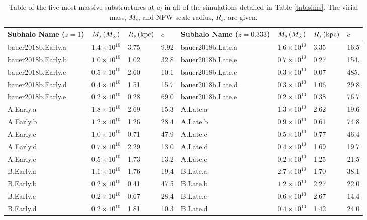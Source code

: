 \begin{table}
\caption{Table of the five most massive substructures at $a_l$ in all of the simulations detailed in Table \ref{tab:sims}. The virial mass, $M_s$, and NFW scale radius, $R_s$, are given.}\label{tab:substructure}
	\begin{tabular}{|l l l l | l l l l|}
	\hline
	Subhalo Name ($z=1$) & $M_s \,(M_\odot)$ & $R_s \, (\text{kpc})$ & $c$ & Subhalo Name ($z=0.333$) & $M_s \,(M_\odot)$ & $R_s \, (\text{kpc})$ & $c$\\	
	\hline
    bauer2018b.Early.a & $1.4 \times 10^{10}$ & 3.75 & 9.92 & bauer2018b.Late.a & $1.6 \times 10^{10}$ & 3.35 & 16.5 \\
    bauer2018b.Early.b & $1.0 \times 10^{10}$ & 1.02 & 32.8 & bauer2018b.Late.e & $0.7 \times 10^{10}$ & 0.27 & 154. \\
    bauer2018b.Early.c & $0.5 \times 10^{10}$ & 2.60 & 10.1 & bauer2018b.Late.c & $0.3 \times 10^{10}$ & 0.07 & 485. \\
    bauer2018b.Early.d & $0.4 \times 10^{10}$ & 1.51 & 15.7 & bauer2018b.Late.d & $0.3 \times 10^{10}$ & 1.06 & 29.8 \\
    bauer2018b.Early.e & $0.2 \times 10^{10}$ & 0.28 & 69.0 & bauer2018b.Late.e & $0.2 \times 10^{10}$ & 0.38 &  76.7\\
	\hline
	A.Early.a & $1.8 \times 10^{10}$ & 2.69 & 15.3 & A.Late.a & $1.3 \times 10^{10}$ & 2.62 & 19.6 \\
	A.Early.b & $1.2 \times 10^{10}$ & 1.26 & 28.4 & A.Late.b & $0.9 \times 10^{10}$ & 0.61 & 74.8 \\
	A.Early.c & $1.0 \times 10^{10}$ & 0.71 & 47.9 & A.Late.c & $0.5 \times 10^{10}$ & 0.77 & 46.4 \\
	A.Early.d & $0.7 \times 10^{10}$ & 2.29 & 13.0 & A.Late.d & $0.4 \times 10^{10}$ & 1.69 & 19.7 \\
	A.Early.e & $0.5 \times 10^{10}$ & 1.73 & 13.2 & A.Late.e & $0.2 \times 10^{10}$ & 1.25 & 21.5 \\
	\hline
	B.Early.a & $1.1 \times 10^{10}$ & 1.76 & 19.4 & B.Late.a & $2.7 \times 10^{10}$ & 1.70 & 38.1 \\
	B.Early.b & $0.2 \times 10^{10}$ & 0.41 & 47.5 & B.Late.b & $1.2 \times 10^{10}$ & 2.27 & 22.0 \\
	B.Early.c & $0.2 \times 10^{10}$ & 0.67 & 28.4 & B.Late.c & $0.6 \times 10^{10}$ & 2.67 & 14.4 \\
	B.Early.d & $0.2 \times 10^{10}$ & 1.81 & 10.3 & B.Late.d & $0.4 \times 10^{10}$ & 1.42 & 24.0 \\

\end{tabular}
\end{table}
